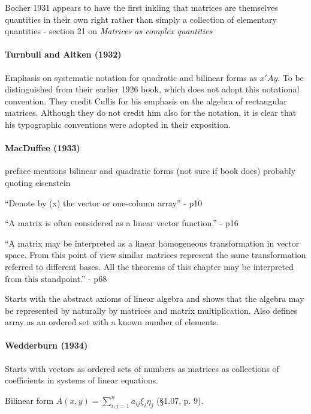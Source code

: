 Bocher 1931 appears to have the first inkling that matrices are themselves
quantities in their own right rather than simply a collection of elementary
quantities - section 21 on \textit{Matrices as complex quantities}



\paragraph{Turnbull and Aitken (1932)}

Emphasis on systematic notation for quadratic and bilinear forms as $x'Ay$.
To be distinguished from their earlier 1926 book, which does not adopt this notational convention.
They credit Cullis for his emphasis on the algebra of rectangular matrices. Although they do not credit him also for the notation, it is clear that his typographic conventions were adopted in their exposition.



\paragraph{MacDuffee (1933)~\cite{MacDuffee1933}}

preface mentions bilinear and quadratic forms (not sure if book does)
probably quoting eisenstein

``Denote by (x) the vector or one-column array'' - p10

``A matrix is often considered as a linear vector function.'' - p16

``A matrix may be interpreted as a linear homogeneous transformation in
vector space. From this point of view similar matrices represent the
same transformation referred to different bases. All the theorems of
this chapter may be interpreted from this standpoint.'' - p68

Starts with the abstract axioms of linear algebra and shows that the algebra
may be represented by naturally by matrices and matrix multiplication. Also
defines array as an ordered set with a known number of elements.

\paragraph{Wedderburn (1934)~\cite{Wedderburn1934}}

Starts with vectors as ordered sets of numbers as matrices as collections of
coefficients in systems of linear equations.

Bilinear form $A(x, y) = \sum^n_{i,j=1} a_{ij} \xi_i \eta_j $ (\S 1.07, p. 9).

